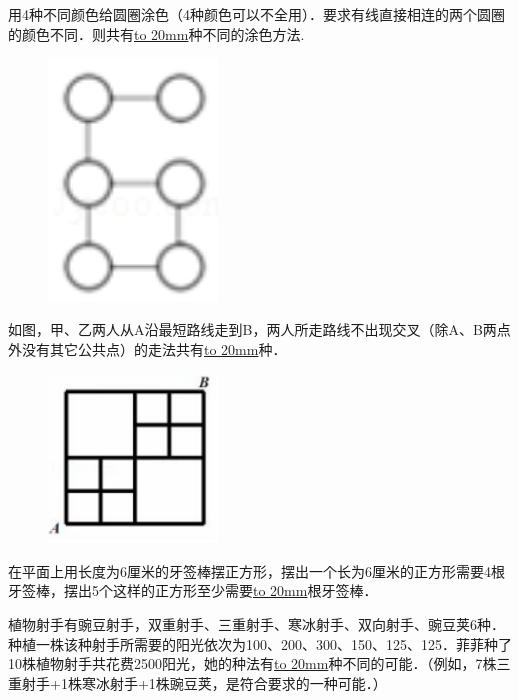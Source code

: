 \item {
    用4种不同颜色给圆圈涂色（4种颜色可以不全用）．要求有线直接相连的两个圆圈的颜色不同．则共有\underline{\hbox to 20mm{}}种不同的涂色方法.
    \begin{figure}[H] 
        \centering
        \includegraphics[width=0.4\textwidth]{./pics/Chapter_6/2016_3.png}
    \end{figure}
}

\item {
    如图，甲、乙两人从A沿最短路线走到B，两人所走路线不出现交叉（除A、B两点外没有其它公共点）的走法共有\underline{\hbox to 20mm{}}种．
    \begin{figure}[H] 
        \centering
        \includegraphics[width=0.4\textwidth]{./pics/Chapter_6/2016_4.png}
    \end{figure}
}

\item {
    在平面上用长度为6厘米的牙签棒摆正方形，摆出一个长为6厘米的正方形需要4根牙签棒，摆出5个这样的正方形至少需要\underline{\hbox to 20mm{}}根牙签棒．
}

\item {
    植物射手有豌豆射手，双重射手、三重射手、寒冰射手、双向射手、豌豆荚6种．种植一株该种射手所需要的阳光依次为100、200、300、150、125、125．菲菲种了10株植物射手共花费2500阳光，她的种法有\underline{\hbox to 20mm{}}种不同的可能．（例如，7株三重射手+1株寒冰射手+1株豌豆荚，是符合要求的一种可能．）
}

